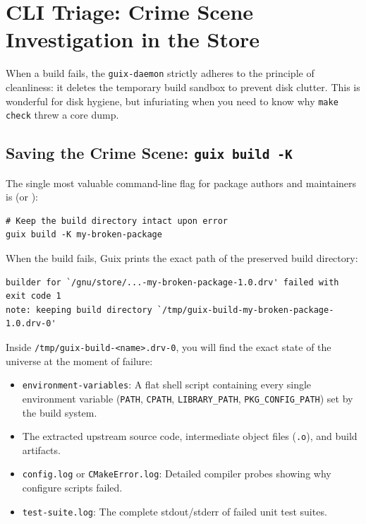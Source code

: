 \section{CLI Triage: Crime Scene Investigation in the Store}

When a build fails, the \texttt{guix-daemon} strictly adheres to the principle of cleanliness: it deletes the temporary build sandbox to prevent disk clutter. This is wonderful for disk hygiene, but infuriating when you need to know why \texttt{make check} threw a core dump.

\subsection{Saving the Crime Scene: \texttt{guix build -K}}

The single most valuable command-line flag for package authors and maintainers is  (or ):

\begin{lstlisting}[style=guixcli]
# Keep the build directory intact upon error
guix build -K my-broken-package
\end{lstlisting}

When the build fails, Guix prints the exact path of the preserved build directory:
\begin{lstlisting}[style=guixcli]
builder for `/gnu/store/...-my-broken-package-1.0.drv' failed with exit code 1
note: keeping build directory `/tmp/guix-build-my-broken-package-1.0.drv-0'
\end{lstlisting}

\begin{protipbox}
Inside \texttt{/tmp/guix-build-<name>.drv-0}, you will find the exact state of the universe at the moment of failure:
\begin{itemize}
  \item \texttt{environment-variables}: A flat shell script containing every single environment variable (\texttt{PATH}, \texttt{CPATH}, \texttt{LIBRARY\_PATH}, \texttt{PKG\_CONFIG\_PATH}) set by the build system.
  \item The extracted upstream source code, intermediate object files (\texttt{.o}), and build artifacts.
  \item \texttt{config.log} or \texttt{CMakeError.log}: Detailed compiler probes showing why configure scripts failed.
  \item \texttt{test-suite.log}: The complete stdout/stderr of failed unit test suites.
\end{itemize}
\end{protipbox}

